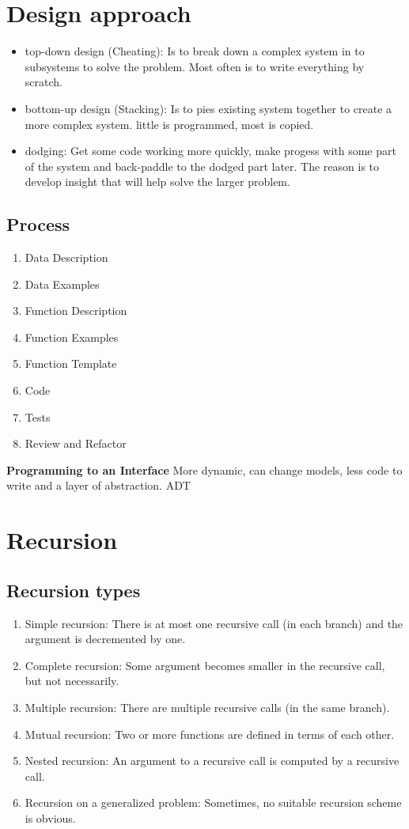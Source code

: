 \section{Design approach}
\begin{itemize}
\item top-down design (Cheating): Is to break down a complex system in to subsystems to solve the problem.
  Most often is to write everything by scratch.
\item bottom-up design (Stacking): Is to pies existing system together to create a more complex system.
  little is programmed, most is copied.
\item dodging: Get some code working more quickly, make progess with some part of the system
  and back-paddle to the dodged part later. The reason is to develop insight that will help solve
  the larger problem.
\end{itemize}


\subsection{Process}
\begin{enumerate}
\item  Data Description
\item  Data Examples
\item  Function Description
\item  Function Examples
\item  Function Template
\item  Code
\item  Tests
\item  Review and Refactor
\end{enumerate}

\textbf{Programming to an Interface}
More dynamic, can change models, less code to write and a layer of abstraction. ADT 

\newpage

\section{Recursion}
\subsection{Recursion types}
\begin{enumerate}
\item Simple recursion: There is at most one recursive call (in each branch)
  and the argument is decremented by one.
\item Complete recursion: Some argument becomes smaller in the recursive call, but not necessarily.
\item Multiple recursion: There are multiple recursive calls (in the same branch).
\item Mutual recursion: Two or more functions are defined in terms of each other.
\item Nested recursion: An argument to a recursive call is computed by a recursive call.
\item Recursion on a generalized problem: Sometimes, no suitable recursion scheme is obvious.
\end{enumerate}



